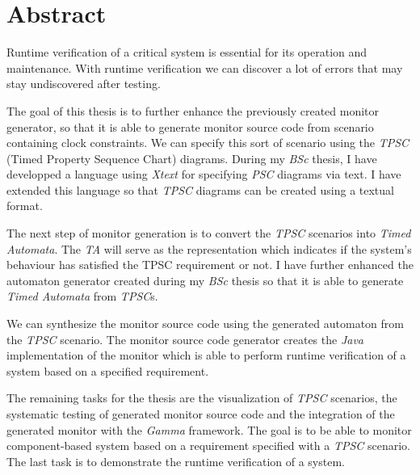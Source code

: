 \vfill
\selectenglish


\chapter*{Abstract}

Runtime verification of a critical system is essential for its operation and maintenance.
With runtime verification we can discover a lot of errors that may stay undiscovered after testing.

The goal of this thesis is to further enhance the previously created monitor generator, so that it is able to generate monitor source code from scenario containing clock constraints.
We can specify this sort of scenario using the \textit{TPSC} (Timed Property Sequence Chart) diagrams.
During my \textit{BSc} thesis, I have developped a language using \textit{Xtext} for specifying \textit{PSC} diagrams via text.
I have extended this language so that \textit{TPSC} diagrams can be created using a textual format.

The next step of monitor generation is to convert the \textit{TPSC} scenarios into \textit{Timed Automata}.
The \textit{TA} will serve as the representation which indicates if the system's behaviour has satisfied the TPSC requirement or not.
I have further enhanced the automaton generator created during my \textit{BSc} thesis so that it is able to generate \textit{Timed Automata} from \textit{TPSC}s.

We can synthesize the monitor source code using the generated automaton from the \textit{TPSC} scenario.
The monitor source code generator creates the \textit{Java} implementation of the monitor which is able to perform runtime verification of a system based on a specified requirement.

The remaining tasks for the thesis are the visualization of \textit{TPSC} scenarios, the systematic testing of generated monitor source code and the integration of the generated monitor with the \textit{Gamma} framework.
The goal is to be able to monitor component-based system based on a requirement specified with a \textit{TPSC} scenario.
The last task is to demonstrate the runtime verification of a system.

\vfill
\selectthesislanguage

\setcounter{romanPage}{\value{page}}
